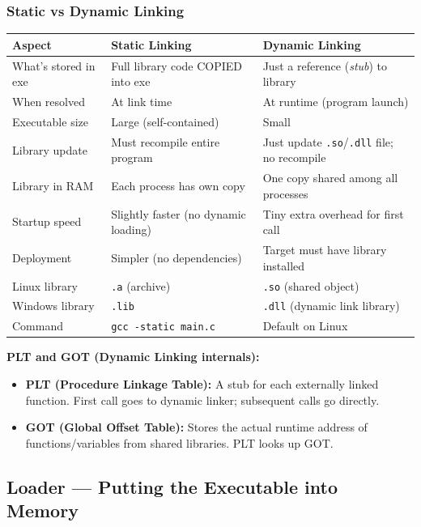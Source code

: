 \documentclass[11pt,a4paper]{article}
\newcommand{\code}[1]{\texttt{\small\colorbox{codebg}{\color{codekw}#1}}}
\newcommand{\term}[1]{\textbf{\color{darkblue}#1}}
\begin{document}
\subsubsection{Static vs Dynamic Linking}

\begin{center}
\begin{tabularx}{\linewidth}{L{3.8cm} X X}
\toprule
\textbf{Aspect} & \textbf{Static Linking} & \textbf{Dynamic Linking} \\
\midrule
What's stored in exe & Full library code COPIED into exe & Just a reference (\textit{stub}) to library \\
When resolved & At link time & At runtime (program launch) \\
Executable size & Large (self-contained) & Small \\
Library update & Must recompile entire program & Just update \texttt{.so}/\texttt{.dll} file; no recompile \\
Library in RAM & Each process has own copy & One copy shared among all processes \\
Startup speed & Slightly faster (no dynamic loading) & Tiny extra overhead for first call \\
Deployment & Simpler (no dependencies) & Target must have library installed \\
Linux library & \texttt{.a} (archive) & \texttt{.so} (shared object) \\
Windows library & \texttt{.lib} & \texttt{.dll} (dynamic link library) \\
Command & \code{gcc -static main.c} & Default on Linux \\
\bottomrule
\end{tabularx}
\end{center}

\textbf{PLT and GOT (Dynamic Linking internals):}
\begin{itemize}[noitemsep]
  \item \term{PLT (Procedure Linkage Table):} A stub for each externally linked function. First call goes to dynamic linker; subsequent calls go directly.
  \item \term{GOT (Global Offset Table):} Stores the actual runtime address of functions/variables from shared libraries. PLT looks up GOT.
\end{itemize}

\subsection{Loader --- Putting the Executable into Memory}
\end{document}
